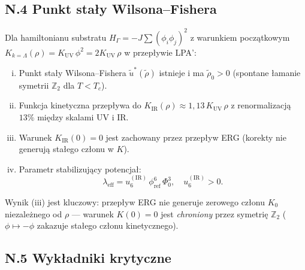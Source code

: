 \subsection*{N.4 Punkt stały Wilsona–Fishera}

\begin{twierdzenie}
\label{thm:ERG_fixed_point}
Dla hamiltonianu substratu $H_\Gamma = -J\sum(\phi_i\phi_j)^2$
z warunkiem początkowym $K_{k=\Lambda}(\rho) = K_\mathrm{UV}\,\phi^2
= 2K_\mathrm{UV}\,\rho$ w przepływie LPA':
\begin{enumerate}[(i)]
  \item Punkt stały Wilsona–Fishera $\tilde u^*(\tilde\rho)$ istnieje
        i ma $\tilde\rho_0 > 0$ (spontane łamanie symetrii $\mathbb{Z}_2$
        dla $T < T_c$).
  \item Funkcja kinetyczna przepływa do $K_\mathrm{IR}(\rho) \approx
        1{,}13\,K_\mathrm{UV}\,\rho$ z renormalizacją $13\%$ między
        skalami UV i IR.
  \item Warunek $K_\mathrm{IR}(0) = 0$ jest zachowany przez przepływ ERG
        (korekty nie generują stałego członu w $K$).
  \item Parametr stabilizujący potencjał:
        \begin{equation}
          \lambda_\mathrm{eff} = u_6^{(\mathrm{IR})}\,\phi_\mathrm{ref}^6\,\Phi_0^3,
          \quad u_6^{(\mathrm{IR})} > 0.
          \label{eq:lambda_eff_ERG}
        \end{equation}
\end{enumerate}
\end{twierdzenie}

\begin{uwaga}
Wynik (iii) jest kluczowy: przepływ ERG nie generuje zerowego członu
$K_0$ niezależnego od $\rho$ — warunek $K(0)=0$ jest \emph{chroniony}
przez symetrię $\mathbb{Z}_2$ ($\phi \mapsto -\phi$ zakazuje
stałego członu kinetycznego).
\end{uwaga}

\subsection*{N.5 Wykładniki krytyczne}

